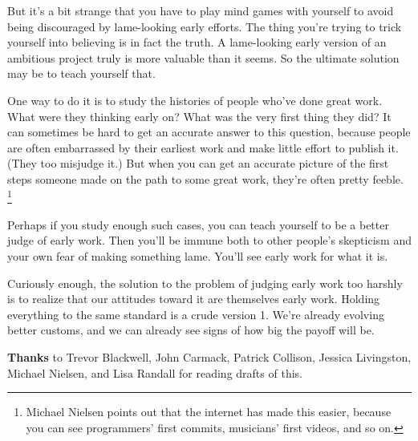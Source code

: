 But it's a bit strange that you have to play mind games with yourself to
avoid being discouraged by lame-looking early efforts. The thing you're
trying to trick yourself into believing is in fact the truth. A
lame-looking early version of an ambitious project truly is more
valuable than it seems. So the ultimate solution may be to teach
yourself that.

One way to do it is to study the histories of people who've done great
work. What were they thinking early on? What was the very first thing
they did? It can sometimes be hard to get an accurate answer to this
question, because people are often embarrassed by their earliest work
and make little effort to publish it. (They too misjudge it.) But when
you can get an accurate picture of the first steps someone made on the
path to some great work, they're often pretty feeble.
\footnote{Michael Nielsen points out that the internet has made this
easier, because you can see programmers' first commits, musicians' first
videos, and so on.}

Perhaps if you study enough such cases, you can teach yourself to be a
better judge of early work. Then you'll be immune both to other people's
skepticism and your own fear of making something lame. You'll see early
work for what it is.

Curiously enough, the solution to the problem of judging early work too
harshly is to realize that our attitudes toward it are themselves early
work. Holding everything to the same standard is a crude version 1.
We're already evolving better customs, and we can already see signs of
how big the payoff will be.


\textbf{Thanks} to Trevor Blackwell, John Carmack, Patrick Collison,
Jessica Livingston, Michael Nielsen, and Lisa Randall for reading drafts
of this.